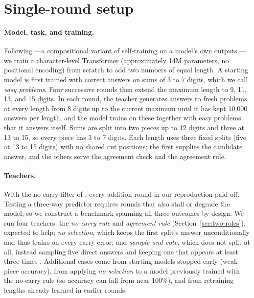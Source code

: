 \section{Single-round setup}
\label{sec:setup}

\paragraph{Model, task, and training.}
Following \citet{shin2026compositional}---a compositional variant of
self-training on a model's own outputs \citep{lee2025selfimproving}---we train
a character-level Transformer (approximately 14M parameters, no positional
encoding) from scratch to add two numbers of equal length. A starting model is
first trained with correct answers on sums of 3 to 7 digits, which we call
\emph{easy problems}. Four successive rounds then extend the maximum length to
9, 11, 13, and 15 digits. In each round, the teacher generates answers to fresh
problems at every length from 8 digits up to the current maximum until it has
kept 10,000 answers per length, and the model trains on these together with
easy problems that it answers itself. Sums are split into two pieces up to 12
digits and three at 13 to 15, so every piece has 3 to 7 digits. Each length
uses three fixed splits (five at 13 to 15 digits) with no shared cut positions;
the first supplies the candidate answer, and the others serve the agreement
check and the agreement rule.

\paragraph{Teachers.}
With the no-carry filter of \citet{shin2026compositional}, every addition round
in our reproduction paid off. Testing a three-way predictor requires rounds
that also stall or degrade the model, so we construct a benchmark spanning all
three outcomes by design. We run four teachers: the \emph{no-carry rule} and
\emph{agreement rule} (Section~\ref{sec:two-roles}), expected to help; \emph{no
selection}, which keeps the first split's answer unconditionally and thus
trains on every carry error; and \emph{sample and vote}, which does not split
at all, instead sampling five direct answers and keeping one that appears at
least three times \citep{wang2023selfconsistency}. Additional cases come from
starting models stopped early (weak piece accuracy), from applying \emph{no
selection} to a model previously trained with the no-carry rule (so accuracy
can fall from near 100\%), and from retraining lengths already learned in
earlier rounds.

